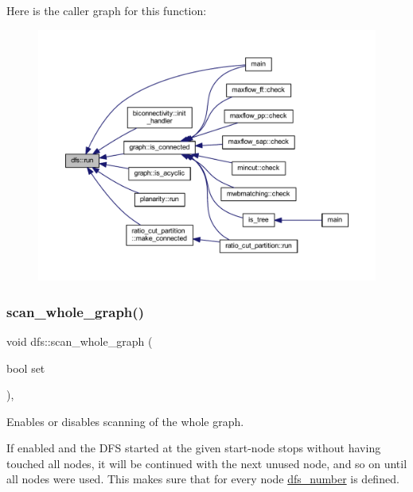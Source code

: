 Here is the caller graph for this function\+:
\nopagebreak
\begin{figure}[H]
\begin{center}
\leavevmode
\includegraphics[width=350pt]{classdfs_af0863b8974d5fd58cd0375c78ed8163b_icgraph}
\end{center}
\end{figure}
\mbox{\label{classdfs_aa7c864a6f3a120720138b187b3ed95b5}} 
\subsubsection{\texorpdfstring{scan\+\_\+whole\+\_\+graph()}{scan\_whole\_graph()}\hspace{0.1cm}{\footnotesize\ttfamily [1/2]}}
{\footnotesize\ttfamily void dfs\+::scan\+\_\+whole\+\_\+graph (\begin{DoxyParamCaption}\item[{bool}]{set }\end{DoxyParamCaption})\hspace{0.3cm}{\ttfamily [inline]}, {\ttfamily [inherited]}}



Enables or disables scanning of the whole graph. 

If enabled and the D\+FS started at the given start-\/node stops without having touched all nodes, it will be continued with the next unused node, and so on until all nodes were used. This makes sure that for every node \mbox{\hyperlink{classdfs_a99727f2274d6af63daae4f0518f3adbe}{dfs\+\_\+number}} is defined.

